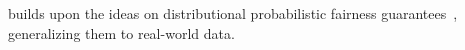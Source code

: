 %
\AVOIRmethodname{} builds upon the ideas on distributional probabilistic fairness guarantees~\citep{albarghouthi2019fairness,bastani2019probabilistic}, generalizing them to real-world data. 


